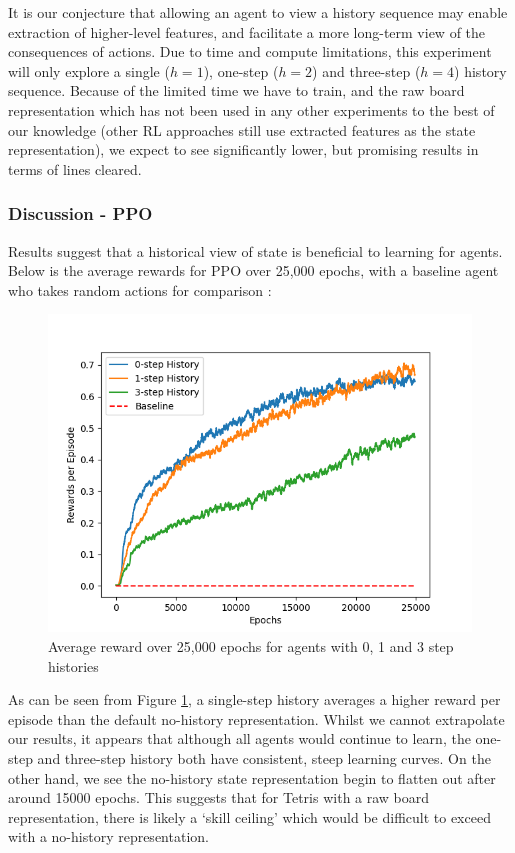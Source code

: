 \documentclass[12pt]{article}
\begin{document}
It is our conjecture that allowing an agent to view a history sequence may enable extraction of higher-level features, and facilitate a more long-term view of the consequences of actions. Due to time and compute limitations, this experiment will only explore a single ($h=1$), one-step ($h=2$) and three-step ($h=4$) history sequence. Because of the limited time we have to train, and the raw board representation which has not been used in any other experiments to the best of our knowledge (other RL approaches still use extracted features as the state representation), we expect to see significantly lower, but promising results in terms of lines cleared. 
\subsubsection{Discussion - PPO}
Results suggest that a historical view of state is beneficial to learning for agents. Below is the average rewards for PPO over 25,000 epochs, with a baseline agent who takes random actions for comparison :
\begin{figure}[H]
    \centering
    \includegraphics[scale=0.7]{17.png}
    \caption{Average reward over 25,000 epochs for agents with 0, 1 and 3 step histories}
    \label{ppohist}
\end{figure}
As can be seen from Figure \ref{ppohist}, a single-step history averages a higher reward per episode than the default no-history representation. Whilst we cannot extrapolate our results, it appears that although all agents would continue to learn, the one-step and three-step history both have consistent, steep learning curves. On the other hand, we see the no-history state representation begin to flatten out after around 15000 epochs. This suggests that for Tetris with a raw board representation, there is likely a `skill ceiling' which would be difficult to exceed with a no-history representation. 
\end{document}

